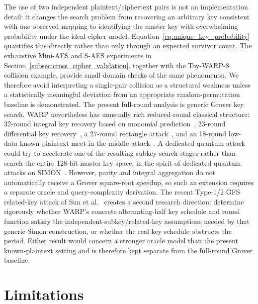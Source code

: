\documentclass[10pt,a4paper]{article}
\begin{document}
The use of two independent plaintext/ciphertext pairs is not an implementation detail: it changes the search problem from recovering an arbitrary key consistent with one observed mapping to identifying the master key with overwhelming probability under the ideal-cipher model.  Equation~\eqref{eq:unique_key_probability} quantifies this directly rather than only through an expected survivor count.  The exhaustive Mini-AES and S-AES experiments in Section~\ref{subsec:cross_cipher_validation}, together with the Toy-WARP-8 collision example, provide small-domain checks of the same phenomenon.  We therefore avoid interpreting a single-pair collision as a structural weakness unless a statistically meaningful deviation from an appropriate random-permutation baseline is demonstrated.
The present full-round analysis is generic Grover key search. WARP nevertheless has unusually rich reduced-round classical structure: 32-round integral key recovery based on monomial prediction~\cite{Hadipour2022}, 23-round differential key recovery~\cite{Teh2022}, a 27-round rectangle attack~\cite{Zeng2025}, and an 18-round low-data known-plaintext meet-in-the-middle attack~\cite{Vaziri2026}. A dedicated quantum attack could try to accelerate one of the resulting subkey-search stages rather than search the entire 128-bit master-key space, in the spirit of dedicated quantum attacks on SIMON~\cite{LiuYang2020}. However, parity and integral aggregation do not automatically receive a Grover square-root speedup, so such an extension requires a separate oracle and query-complexity derivation.
The recent Type-1/2 GFS related-key attack of Sun et al.~\cite{Sun2026} creates a second research direction: determine rigorously whether WARP's concrete alternating-half key schedule and round function satisfy the independent-subkey/related-key assumptions needed by that generic Simon construction, or whether the real key schedule obstructs the period. Either result would concern a stronger oracle model than the present known-plaintext setting and is therefore kept separate from the full-round Grover baseline.

\section{Limitations}
\label{sec:limitations}
\end{document}
